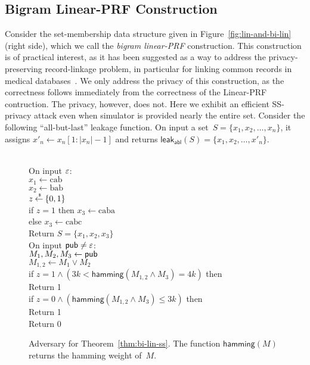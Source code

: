 \subsection{Bigram Linear-PRF Construction}
Consider the set-membership data structure given in Figure~\ref{fig:lin-and-bi-lin} (right side), which we call the \emph{bigram linear-PRF} construction.  This construction is of practical interest, as it has been suggested as a way to address the privacy-preserving record-linkage problem, in particular for linking common records in medical databases~\cite{neidermayer,xxx}.
We only address the privacy of this construction, as the correctness follows immediately from the correctness of the Linear-PRF contruction.  The privacy, however, does not.  Here we exhibit an efficient SS-privacy attack even when simulator is provided nearly the entire set.  Consider the following ``all-but-last'' leakage function.  On input a set~$S=\{x_1,x_2,\ldots,x_n\}$, it assigns $x'_n \gets x_n[1:|x_n|-1]$ and returns $\mathsf{leak_{abl}}(S)=\{x_1,x_2,\ldots,x'_n\}$.  

\begin{figure}
\centering
{}
{
\\
On input $\varepsilon$:\\
\nudge $x_1 \gets \mathrm{cab}$\\
\nudge $x_2 \gets \mathrm{bab}$\\
\nudge $z {\:\stackrel{{\scriptscriptstyle \hspace{0.2em}\$}} {\leftarrow}\:} \{0,1\}$\\
\nudge if $z=1$ then $x_3 \gets \mathrm{caba}$\\
\nudge else $x_3 \gets \mathrm{cabc}$\\
\nudge Return $S=\{x_1,x_2,x_3\}$\\
On input ${\sf pub} \neq \varepsilon$:\\
\nudge $M_1,M_2,M_3 \gets {\sf pub}$\\
\nudge $M_{1,2} \gets M_1 \vee M_2$\\
\nudge if $z=1 \wedge \left(3k < \mathsf{hamming}(M_{1,2} \wedge M_3) = 4k\right)$ then \\
\nudge\nudge Return 1 \\
\nudge if $z=0 \wedge \left(\mathsf{hamming}(M_{1,2} \wedge M_3) \leq 3k\right)$ then \\
\nudge\nudge Return 1 \\
\nudge Return 0
}
\caption{Adversary for Theorem~\ref{thm:bi-lin-ss}. The function $\mathsf{hamming}(M)$ returns the hamming weight of~$M$.}
\label{fig:adv-bi-lin-ss}
\end{figure}

